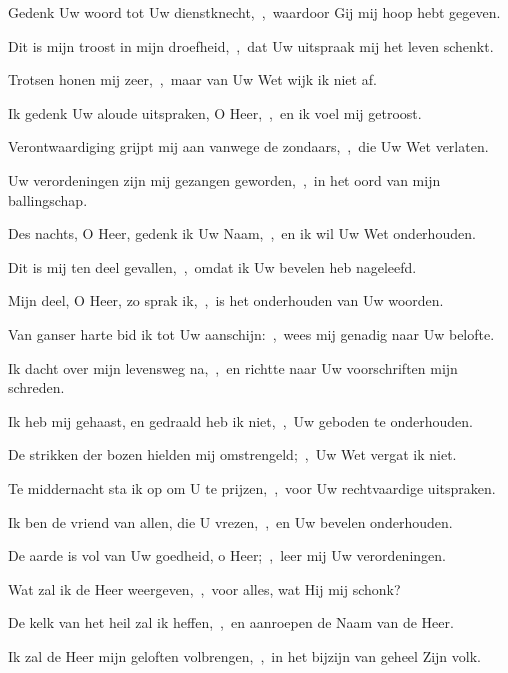 \documentclass[12pt,twoside,a5paper]{article}
\begin{document}

\begin{halfparskip}
  Gedenk Uw woord tot Uw dienstknecht,~\sep\ waardoor Gij mij hoop hebt gegeven.


  Dit is mijn troost in mijn droefheid,~\sep\ dat Uw uitspraak mij het leven schenkt.

  Trotsen honen mij zeer,~\sep\ maar van Uw Wet wijk ik niet af.

  Ik gedenk Uw aloude uitspraken, O Heer,~\sep\ en ik voel mij getroost.

  Verontwaardiging grijpt mij aan vanwege de zondaars,~\sep\ die Uw Wet verlaten.

  Uw verordeningen zijn mij gezangen geworden,~\sep\ in het oord van mijn ballingschap.

  Des nachts, O Heer, gedenk ik Uw Naam,~\sep\ en ik wil Uw Wet onderhouden.

  Dit is mij ten deel gevallen,~\sep\ omdat ik Uw bevelen heb nageleefd.

  Mijn deel, O Heer, zo sprak ik,~\sep\ is het onderhouden van Uw woorden.

  Van ganser harte bid ik tot Uw aanschijn:~\sep\ wees mij genadig naar Uw belofte.

  Ik dacht over mijn levensweg na,~\sep\ en richtte naar Uw voorschriften mijn schreden.

  Ik heb mij gehaast, en gedraald heb ik niet,~\sep\ Uw geboden te onderhouden.

  De strikken der bozen hielden mij omstrengeld;~\sep\ Uw Wet vergat ik niet.

  Te middernacht sta ik op om U te prijzen,~\sep\ voor Uw rechtvaardige uitspraken.

  Ik ben de vriend van allen, die U vrezen,~\sep\ en Uw bevelen onderhouden.

  De aarde is vol van Uw goedheid, o Heer;~\sep\ leer mij Uw verordeningen.
\end{halfparskip}

\noindent\begin{minipage}{\textwidth}
\end{minipage}

\begin{halfparskip}
  Wat zal ik de Heer weergeven,~\sep\ voor alles, wat Hij mij schonk?


  De kelk van het heil zal ik heffen,~\sep\ en aanroepen de Naam van de Heer.

  Ik zal de Heer mijn geloften volbrengen,~\sep\ in het bijzijn van geheel Zijn volk.
\end{halfparskip}
\end{document}
